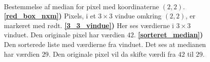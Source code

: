 {\begin{figure}[!h]
    \centering
    \\
    \hspace{1em}
        \caption[]{
            Bestemmelse af median for pixel med koordinaterne $(2, 2)$.
            \textbf{\ref{red_box_nxm})} Pixels, i et $3\times3$ vindue
            omkring $(2, 2)$, er markeret med rødt.
            \textbf{\ref{3_3_vindue})} Her ses værdierne i $3\times3$
            vinduet.  Den originale pixel har værdien $42$.
            \textbf{\ref{sorteret_median})} Den sorterede liste med
            værdierne fra vinduet. Det ses at medianen har værdien $29$.
            Den originale pixel vil da skifte værdi fra $42$ til $29$.
        }
\end{figure}

}
